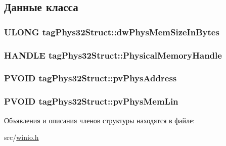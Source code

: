 \subsection{Данные класса}
\hypertarget{structtag_phys32_struct_adcb5fe8ed2f92bd1ee900a28a8926478}{
\subsubsection[{dw\-Phys\-Mem\-Size\-In\-Bytes}]{\setlength{\rightskip}{0pt plus 5cm}U\-L\-O\-N\-G tag\-Phys32\-Struct\-::dw\-Phys\-Mem\-Size\-In\-Bytes}}\label{structtag_phys32_struct_adcb5fe8ed2f92bd1ee900a28a8926478}
\hypertarget{structtag_phys32_struct_a62728941351cae475f59a61518eed9d5}{
\subsubsection[{Physical\-Memory\-Handle}]{\setlength{\rightskip}{0pt plus 5cm}H\-A\-N\-D\-L\-E tag\-Phys32\-Struct\-::\-Physical\-Memory\-Handle}}\label{structtag_phys32_struct_a62728941351cae475f59a61518eed9d5}
\hypertarget{structtag_phys32_struct_aa7eb113c10d6a15445809774a7138452}{
\subsubsection[{pv\-Phys\-Address}]{\setlength{\rightskip}{0pt plus 5cm}P\-V\-O\-I\-D tag\-Phys32\-Struct\-::pv\-Phys\-Address}}\label{structtag_phys32_struct_aa7eb113c10d6a15445809774a7138452}
\hypertarget{structtag_phys32_struct_a6bdc8d696ccee449b9ba07ce0955e49b}{
\subsubsection[{pv\-Phys\-Mem\-Lin}]{\setlength{\rightskip}{0pt plus 5cm}P\-V\-O\-I\-D tag\-Phys32\-Struct\-::pv\-Phys\-Mem\-Lin}}\label{structtag_phys32_struct_a6bdc8d696ccee449b9ba07ce0955e49b}


Объявления и описания членов структуры находятся в файле\-:\begin{DoxyCompactItemize}
\item 
src/\hyperlink{winio_8h}{winio.\-h}\end{DoxyCompactItemize}
